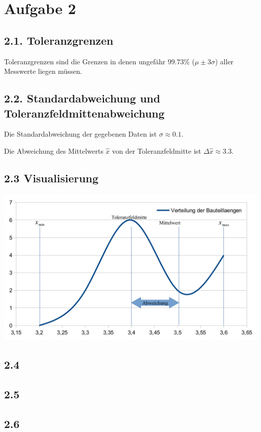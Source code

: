 \documentclass[12pt,a4paper]{article}
\begin{document}
\pagebreak
\section*{Aufgabe 2}
\subsection*{2.1. Toleranzgrenzen}
Toleranzgrenzen sind die Grenzen in denen ungefähr $99.73\%$ ($\mu \pm 3\sigma$) aller Messwerte liegen müssen.

\subsection*{2.2. Standardabweichung und Toleranzfeldmittenabweichung}
Die Standardabweichung der gegebenen Daten ist $\sigma \approx 0.1$.

Die Abweichung des Mittelwerts $\hat{x}$ von der Toleranzfeldmitte ist $\Delta \hat{x} \approx 3.3$.

\subsection*{2.3 Visualisierung}

\includegraphics[scale=0.40]{2_3_diag}

\subsection*{2.4}

\subsection*{2.5}

\subsection*{2.6}
\end{document}
